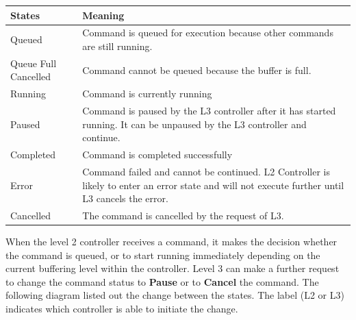 \documentclass[11pt]{book}
\begin{document}
\begin{table}[H]
\begin{adjustbox}{max width=\textwidth}
\begin{tabular}{p{2.7cm}p{13.02cm}}
\hline
\multicolumn{1}{|p{2.7cm}}{{\footnotesize \textbf{States}}} & 
\multicolumn{1}{|p{13.02cm}|}{{\footnotesize \textbf{Meaning}}} \\ 
\hline
\multicolumn{1}{|p{2.7cm}}{{\footnotesize Queued}} & 
\multicolumn{1}{|p{13.02cm}|}{{\footnotesize Command is queued for execution because other commands are still running. }} \\ 
\hline
\multicolumn{1}{|p{2.7cm}}{{\footnotesize Queue Full Cancelled}} & 
\multicolumn{1}{|p{13.02cm}|}{{\footnotesize Command cannot be queued because the buffer is full.}} \\ 
\hline
\multicolumn{1}{|p{2.7cm}}{{\footnotesize Running}} & 
\multicolumn{1}{|p{13.02cm}|}{{\footnotesize Command is currently running}} \\ 
\hline
\multicolumn{1}{|p{2.7cm}}{{\footnotesize Paused}} & 
\multicolumn{1}{|p{13.02cm}|}{{\footnotesize Command is paused by the L3 controller after it has started running. It can be unpaused by the L3 controller and continue.\par}} \\ 
\hline
\multicolumn{1}{|p{2.7cm}}{{\footnotesize Completed}} & 
\multicolumn{1}{|p{13.02cm}|}{{\footnotesize Command is completed successfully}} \\ 
\hline
\multicolumn{1}{|p{2.7cm}}{{\footnotesize Error}} & 
\multicolumn{1}{|p{13.02cm}|}{{\footnotesize Command failed and cannot be continued. L2 Controller is likely to enter an error state and will not execute further until L3 cancels the error.\par}} \\ 
\hline
\multicolumn{1}{|p{2.7cm}}{{\footnotesize Cancelled}} & 
\multicolumn{1}{|p{13.02cm}|}{{\footnotesize The command is cancelled by the request of L3.}} \\ 
\hline
\end{tabular}
\end{adjustbox}
\end{table}
When the level 2 controller receives a command, it makes the decision whether the command is queued, or to start running immediately depending on the current buffering level within the controller. Level 3 can make a further request to change the command status to \textbf{Pause }or to \textbf{Cancel }the command. The following diagram listed out the change between the states. The label (L2 or L3) indicates which controller is able to initiate the change. 
\end{document}
